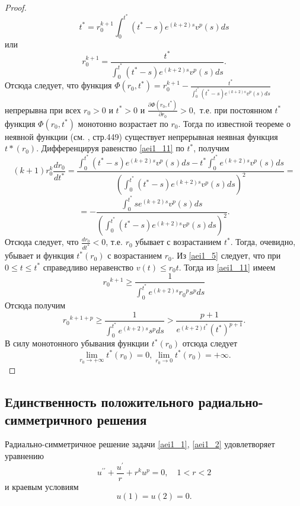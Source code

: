 \begin{proof}
$$
t^*=r_0^{k+1}\int_0^{t^*}(t^*-s)e^{(k+2)s}v^p(s)ds
$$
или
\begin{equation}\label{aei1_11}
r_0^{k+1}=\frac{t^*}{\int_0^{t^*}(t^*-s)e^{(k+2)s}v^p(s)ds}.
\end{equation}
Отсюда следует, что функция $
\Phi(r_0, t^*)=r_0^{k+1}-\frac{t^*}{\int_0^{t^*}(t^*-s)e^{(k+2)s}v^p(s)ds}$
непрерывна при всех $ r_0>0 $ и $ t^*>0 $ и $ \frac{\partial
\Phi(r_0, t^*)}{\partial r_0}>0, $ т.е. при постоянном $ t^* $
функция $ \Phi(r_0,t^*)$ монотонно возрастает по $ r_0 $. Тогда по
известной теореме о неявной функции (см. \cite{aeiL_15}, стр.449) существует
непрерывная неявная функция $ t*(r_0). $  Дифференцируя равенство
\eqref{aei1_11} по $ t^* $, получим
$$
(k+1)r_0^k \frac{dr_0}{dt^*}= \frac
{\int_0^{t^*}(t^*-s)e^{(k+2)s}v^p(s)ds- t^*
\int_0^{t^*}e^{(k+2)s}v^p(s)ds} { \left (
\int_0^{t^*}(t^*-s)e^{(k+2)s}v^p(s)ds \right )^2}=
$$
$$
=-\frac {\int_0^{t^*}se^{(k+2)s}v^p(s)ds}{ \left (
\int_0^{t^*}(t^*-s)e^{(k+2)s}v^p(s)ds \right )^2}.
$$
Отсюда следует, что $ \frac{dr_0}{dt^*} <0 $, т.е. $ r_0 $ убывает с
возрастанием $ t^* $. Тогда, очевидно, убывает и функция $ t^*(r_0)
$ с возрастанием $ r_0 $. Из \eqref{aei1_5} следует, что при $ 0 \leq t \leq
t^* $ справедливо неравенство $ v(t) \leq r_0t$. 
Тогда из \eqref{aei1_11} имеем
$$
{r_0}^{k+1} \geq \frac{1}{\int_0^{t^*}e^{(k+2)s}{r_0}^ps^pds}
$$
Отсюда получим
\begin{equation}\label{aei1_12}
{r_0}^{k+1+p} \geq \frac{1}{\int_0^{t^*}e^{(k+2)s}s^pds} >
\frac{p+1}{e^{(k+2)t^*} (t^*)^{p+1}}. 
\end{equation}
В силу монотонного убывания  функции $ t^*(r_0) $ отсюда следует
$$
\displaystyle \lim_{r_0 \to +\infty}t^{*}(r_0)=0, \displaystyle
\lim_{r_0 \to 0}t^{*}(r_0)=+\infty.
$$
\end{proof}

 \subsection{Единственность положительного радиально-симметричного решения}

Радиально-симметричное решение задачи \eqref{aei1_1}, \eqref{aei1_2} удовлетворяет
уравнению
\begin{equation}\label{aei1_13}
u^{\prime\prime}+\frac{u^{\prime}}{r}+r^ku^p=0, \quad 1<r<2
\end{equation}
и краевым условиям
\begin{equation}\label{aei1_14}
u(1)=u(2)=0. 
\end{equation}

